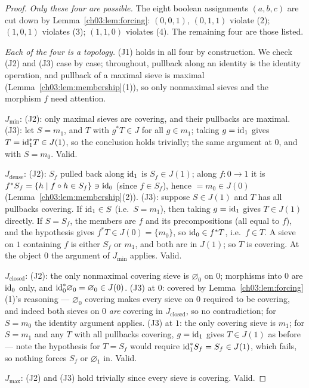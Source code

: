 \begin{proof}
\emph{Only these four are possible.} The eight boolean assignments
$(a, b, c)$ are cut down by Lemma~\ref{ch03:lem:forcing}:
$(0,0,1)$, $(0,1,1)$ violate (2); $(1,0,1)$ violates (3);
$(1,1,0)$ violates (4). The remaining four are those listed.

\emph{Each of the four is a topology.} (J1) holds in all four by
construction. We check (J2) and (J3) case by case; throughout,
pullback along an identity is the identity operation, and pullback
of a maximal sieve is maximal (Lemma~\ref{ch03:lem:membership}(1)),
so only nonmaximal sieves and the morphism $f$ need attention.

$J_{\min}$: (J2): only maximal sieves are covering, and their
pullbacks are maximal. (J3): let $S = m_1$, and $T$ with
$g^* T \in J$ for all $g \in m_1$; taking $g = \mathrm{id}_1$ gives
$T = \mathrm{id}_1^* T \in J(1)$, so the conclusion holds trivially; the
same argument at $0$, and with $S = m_0$. Valid.

$J_{\mathrm{dense}}$: (J2): $S_f$ pulled back along $\mathrm{id}_1$ is
$S_f \in J(1)$; along $f : 0 \to 1$ it is
$f^* S_f = \{h \mid f \circ h \in S_f\} \ni \mathrm{id}_0$ (since
$f \in S_f$), hence $= m_0 \in J(0)$
(Lemma~\ref{ch03:lem:membership}(2)). (J3): suppose
$S \in J(1)$ and $T$ has all pullbacks covering. If
$\mathrm{id}_1 \in S$ (i.e.\ $S = m_1$), then taking $g = \mathrm{id}_1$ gives
$T \in J(1)$ directly. If $S = S_f$, the members are $f$ and its
precompositions (all equal to $f$), and the hypothesis gives
$f^* T \in J(0) = \{m_0\}$, so $\mathrm{id}_0 \in f^* T$, i.e.\
$f \in T$. A sieve on $1$ containing $f$ is either $S_f$ or
$m_1$, and both are in $J(1)$; so $T$ is covering. At the object
$0$ the argument of $J_{\min}$ applies. Valid.

$J_{\mathrm{closed}}$: (J2): the only nonmaximal covering sieve is
$\varnothing_0$ on $0$; morphisms into $0$ are $\mathrm{id}_0$ only, and
$\mathrm{id}_0^* \varnothing_0 = \varnothing_0 \in J(0)$. (J3) at $0$:
covered by Lemma~\ref{ch03:lem:forcing}(1)'s reasoning ---
$\varnothing_0$ covering makes every sieve on $0$ required to be
covering, and indeed both sieves on $0$ \emph{are} covering in
$J_{\mathrm{closed}}$, so no contradiction; for $S = m_0$ the
identity argument applies. (J3) at $1$: the only covering sieve is
$m_1$; for $S = m_1$ and any $T$ with all pullbacks covering,
$g = \mathrm{id}_1$ gives $T \in J(1)$ as before --- note the hypothesis
for $T = S_f$ would require $\mathrm{id}_1^* S_f = S_f \in J(1)$, which
fails, so nothing forces $S_f$ or $\varnothing_1$ in. Valid.

$J_{\max}$: (J2) and (J3) hold trivially since every sieve is
covering. Valid.
\end{proof}

